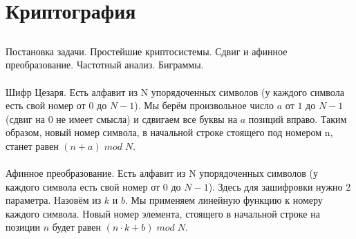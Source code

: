 \documentclass[a4paper,10pt]{article} %
\begin{document}
	\section{Криптография}
	\subsection{}
	Постановка задачи. Простейшие криптосистемы. Сдвиг и афинное преобразование.
	Частотный анализ. Биграммы.
	\\\\
	Шифр Цезаря. Есть алфавит из N упорядоченных символов (у каждого символа есть свой номер от $0$ до $N - 1$). Мы берём произвольное число $a$ от $1$ до $N - 1$ (сдвиг на 0 не имеет смысла) и сдвигаем все буквы на $a$ позиций вправо. Таким образом, новый номер символа, в начальной строке стоящего под номером n, станет равен $(n + a) \; mod \; N$.
	\\\\
	Афинное преобразование. Есть алфавит из N упорядоченных символов (у каждого символа есть свой номер от $0$ до $N - 1$). Здесь для зашифровки нужно 2 параметра. Назовём из $k$ и $b$. Мы применяем линейную функцию к номеру каждого символа. Новый номер элемента, стоящего в начальной строке на позиции $n$ будет равен $(n \cdot k + b) \; mod \; N$.
	
	\subsection{}
	
\end{document}
